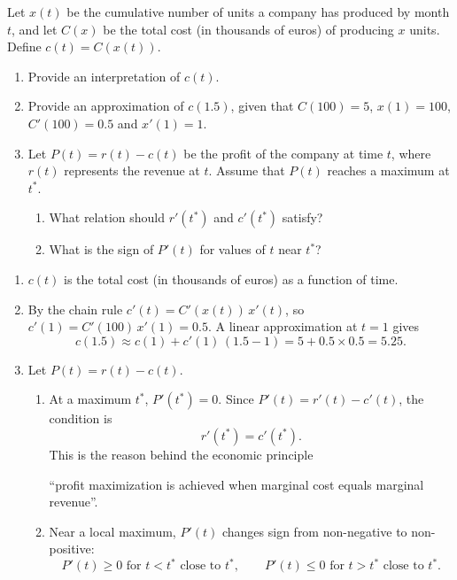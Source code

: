 \documentclass[11pt]{exam}
\begin{document}
\begin{questions}
\question[3]
Let $x(t)$ be the cumulative number of units a company has produced by month $t$, and let $C(x)$ be the total cost (in thousands of euros) of producing $x$ units.
Define $c(t) = C(x(t))$.
\begin{enumerate}[leftmargin = 0.5cm, label = (\alph*), rightmargin = 0.2cm]
    \item Provide an interpretation of $c(t)$.
    \item Provide an approximation of $c(1.5)$, given that $C(100) = 5$, $x(1) = 100$, $C'(100) = 0.5$ and $x'(1) = 1$.
    \item Let $P(t) = r(t) - c(t)$ be the profit of the company at time $t$, where $r(t)$ represents the revenue at $t$. Assume that $P(t)$ reaches a maximum at $t^*$. 
    \begin{enumerate}[leftmargin = 0.5cm, label = (\roman*), rightmargin = 0.2cm]
        
        \item What relation should $r'(t^*)$ and $c'(t^*)$ satisfy?

        \item What is the sign of $P'(t)$ for values of $t$ near $t^*$?  
        
    \end{enumerate}
\end{enumerate}

\begin{solution}[0cm]
\begin{enumerate}[leftmargin=0.5cm,label=(\alph*),rightmargin=0.2cm]
  \item $c(t)$ is the total cost (in thousands of euros) as a function of time.
  \item By the chain rule $c'(t)=C'(x(t))\,x'(t)$, so $c'(1)=C'(100)\,x'(1)=0.5$. A linear approximation at $t=1$ gives
  \[
    c(1.5)\approx c(1)+c'(1)\,(1.5-1)=5+0.5\times0.5=5.25.
  \]
  \item Let $P(t)=r(t)-c(t)$.
  \begin{enumerate}[leftmargin=0.5cm,label=(\roman*),rightmargin=0.2cm]
    \item At a maximum $t^*$, \(P'(t^*)=0\). Since \(P'(t)=r'(t)-c'(t)\), the condition is
    \[
      r'(t^*)=c'(t^*).
    \]
    This is the reason behind the economic principle
    \begin{center}
    ``profit maximization is achieved when marginal cost equals marginal revenue''.    
    \end{center}
    
    \item Near a local maximum, \(P'(t)\) changes sign from non-negative to non-positive:
    \[
      P'(t)\geq 0 \text{ for } t<t^* \text{ close to } t^*,\qquad
      P'(t)\leq 0 \text{ for } t>t^* \text{ close to } t^* .
    \]
  \end{enumerate}
\end{enumerate}
\end{solution}

\end{questions}	
\end{document}
